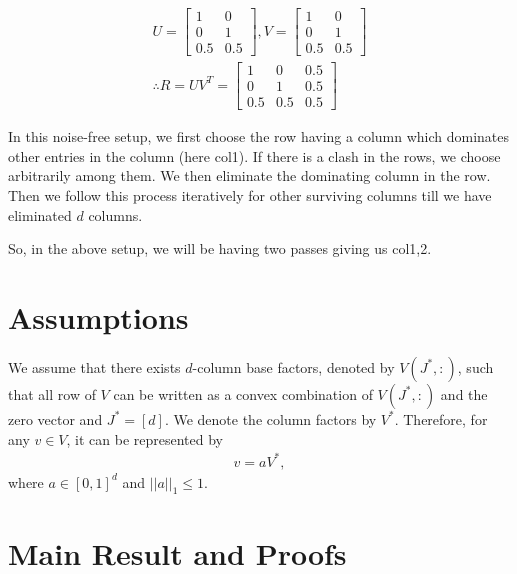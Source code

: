 \documentclass[twoside]{article}
\begin{document}
\begin{align*}
U = \begin{bmatrix}
    1 & 0 \\
    0 & 1 \\
    0.5 & 0.5
\end{bmatrix} , V= \begin{bmatrix}
    1 & 0 \\
    0 & 1 \\
    0.5 & 0.5
\end{bmatrix} \\
\therefore R = UV^{T} = \begin{bmatrix}
    1 & 0 & 0.5\\
    0 & 1 & 0.5\\
    0.5 & 0.5 & 0.5
\end{bmatrix} 
\end{align*}

In this noise-free setup, we first choose the row having a column which dominates other entries in the column (here col{1}). If there is a clash  in the rows, we choose arbitrarily among them. We then eliminate the dominating column in the row. Then we follow this process iteratively for other surviving columns till we have eliminated $d$ columns. 

So, in the above setup, we will be having two passes giving us col{1,2}.



\section{Assumptions}

\begin{assumption}
\label{assm:1}
We assume that there exists $d$-column base factors, denoted by $V(J^*,:)$, such that all row of $V$ can be written as a convex combination of $V(J^*,:)$ and the zero vector and $J^* = [d]$. We denote the column factors by $V^*$. Therefore, for any $v\in V$, it can be represented by
\begin{align*}
v = aV^* , 
\end{align*}
where $a\in [0,1]^{d}$ and $ ||a||_1 \leq 1$.
\end{assumption}

\section{Main Result and Proofs}
\end{document}
